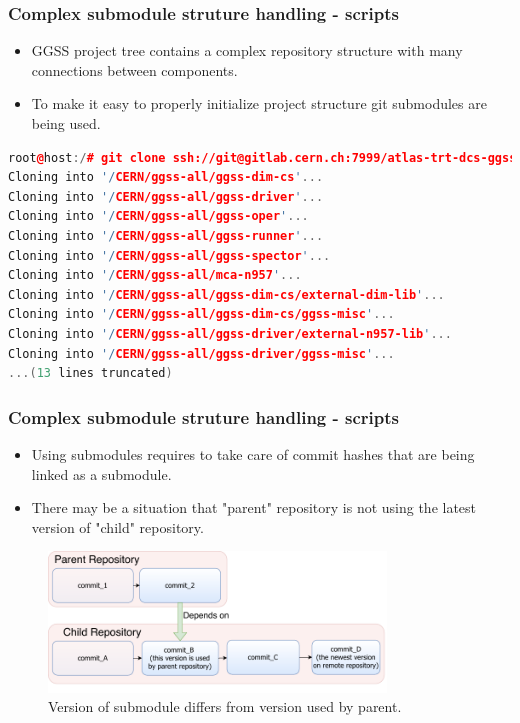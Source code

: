 \documentclass[10pt]{beamer}
\begin{document}
\begin{frame}[fragile]
\frametitle{Complex submodule struture handling - scripts}
\begin{itemize}
\item GGSS project tree contains a complex repository structure with many connections between components.
\item To make it easy to properly initialize project structure git submodules are being used.
\end{itemize}
\begin{lstlisting}[language=c++, caption={Initialize project structure with one command.}]
root@host:/# git clone ssh://git@gitlab.cern.ch:7999/atlas-trt-dcs-ggss/ggss-all.git && cd ggss-all && git submodule update --init --recursive
Cloning into '/CERN/ggss-all/ggss-dim-cs'...
Cloning into '/CERN/ggss-all/ggss-driver'...
Cloning into '/CERN/ggss-all/ggss-oper'...
Cloning into '/CERN/ggss-all/ggss-runner'...
Cloning into '/CERN/ggss-all/ggss-spector'...
Cloning into '/CERN/ggss-all/mca-n957'...
Cloning into '/CERN/ggss-all/ggss-dim-cs/external-dim-lib'...
Cloning into '/CERN/ggss-all/ggss-dim-cs/ggss-misc'...
Cloning into '/CERN/ggss-all/ggss-driver/external-n957-lib'...
Cloning into '/CERN/ggss-all/ggss-driver/ggss-misc'...
...(13 lines truncated)
\end{lstlisting}
\end{frame}

\begin{frame}[fragile]
\frametitle{Complex submodule struture handling - scripts}
\begin{itemize}
\item Using submodules requires to take care of commit hashes that are being linked as a submodule.
\item There may be a situation that "parent" repository is not using the latest version of "child" repository.
\end{itemize}
\begin{figure}
    \centering
    \includegraphics[width=0.8\textwidth]{resources/submodules_problem.pdf}
    \caption{Version of submodule differs from version used by parent.}
\end{figure}
\end{frame}
\end{document}
